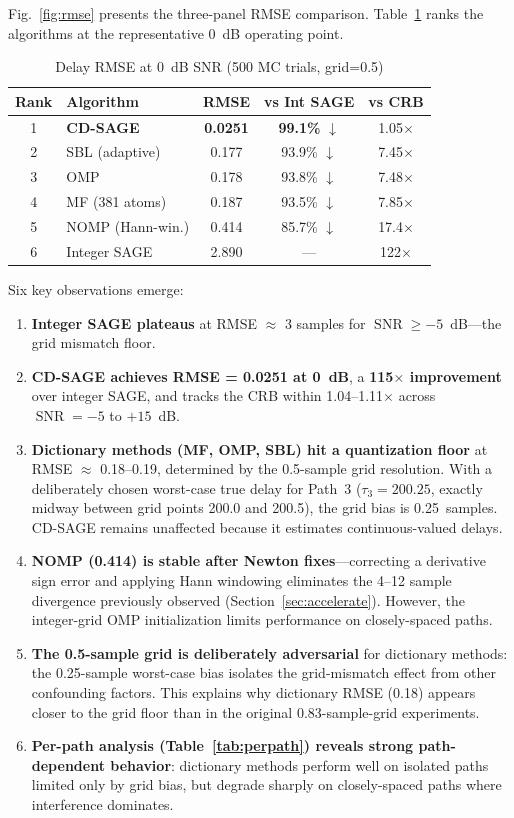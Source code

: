 \documentclass[journal]{IEEEtran}
\DeclareMathOperator{\SNR}{SNR}
\begin{document}
Fig.~\ref{fig:rmse} presents the three-panel RMSE comparison. Table~\ref{tab:ranking} ranks the algorithms at the representative 0~dB operating point.

\begin{table}[t]
\centering
\caption{Delay RMSE at 0~dB SNR (500 MC trials, grid=0.5)}
\label{tab:ranking}
\small
\begin{tabular}{@{}clccc@{}}
\toprule
Rank & Algorithm & RMSE & vs Int SAGE & vs CRB \\
\midrule
1 & \textbf{CD-SAGE} & \textbf{0.0251} & \textbf{99.1\%} $\downarrow$ & 1.05$\times$ \\
2 & SBL (adaptive) & 0.177 & 93.9\% $\downarrow$ & 7.45$\times$ \\
3 & OMP & 0.178 & 93.8\% $\downarrow$ & 7.48$\times$ \\
4 & MF (381 atoms) & 0.187 & 93.5\% $\downarrow$ & 7.85$\times$ \\
5 & NOMP (Hann-win.) & 0.414 & 85.7\% $\downarrow$ & 17.4$\times$ \\
6 & Integer SAGE & 2.890 & --- & 122$\times$ \\
\bottomrule
\end{tabular}
\end{table}

Six key observations emerge:

\begin{enumerate}
\item \textbf{Integer SAGE plateaus} at RMSE $\approx$ 3 samples for $\SNR \ge -5$~dB---the grid mismatch floor.
\item \textbf{CD-SAGE achieves RMSE = 0.0251 at 0~dB}, a \textbf{115$\times$ improvement} over integer SAGE, and tracks the CRB within 1.04--1.11$\times$ across $\SNR = -5$ to $+15$~dB.
\item \textbf{Dictionary methods (MF, OMP, SBL) hit a quantization floor} at RMSE $\approx$ 0.18--0.19, determined by the 0.5-sample grid resolution. With a deliberately chosen worst-case true delay for Path~3 ($\tau_3 = 200.25$, exactly midway between grid points 200.0 and 200.5), the grid bias is 0.25~samples. CD-SAGE remains unaffected because it estimates continuous-valued delays.
\item \textbf{NOMP (0.414) is stable after Newton fixes}---correcting a derivative sign error and applying Hann windowing eliminates the 4--12 sample divergence previously observed (Section~\ref{sec:accelerate}). However, the integer-grid OMP initialization limits performance on closely-spaced paths.
\item \textbf{The 0.5-sample grid is deliberately adversarial} for dictionary methods: the 0.25-sample worst-case bias isolates the grid-mismatch effect from other confounding factors. This explains why dictionary RMSE (0.18) appears closer to the grid floor than in the original 0.83-sample-grid experiments.
\item \textbf{Per-path analysis (Table~\ref{tab:perpath}) reveals strong path-dependent behavior}: dictionary methods perform well on isolated paths limited only by grid bias, but degrade sharply on closely-spaced paths where interference dominates.
\end{enumerate}
\end{document}
